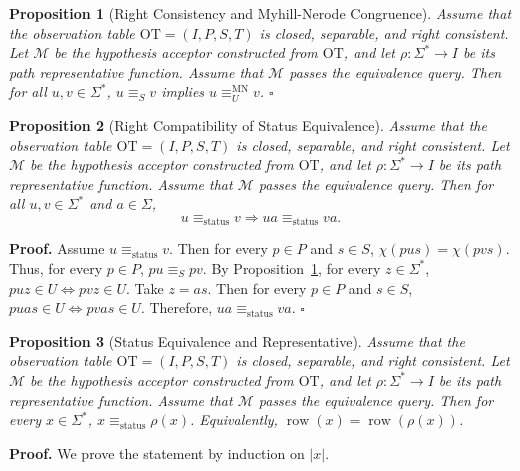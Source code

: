 \documentclass{ieice-tecrep}
\newtheorem{proposition}{Proposition}
\begin{document}
\begin{proposition}[Right Consistency and Myhill-Nerode Congruence]\label{proposition-2.3-right-consistency-and-myhill-nerode-congruence}
Assume that the observation table
\(\mathrm{OT}=(I,P,S,T)\) is closed, separable, and right consistent.
Let \(\mathcal{M}\) be the hypothesis acceptor constructed from \(\mathrm{OT}\),
and let \(\rho:\Sigma^*\to I\) be its path representative function.
Assume that \(\mathcal{M}\) passes the equivalence query. Then for all \(u,v\in\Sigma^*\), \(u\equiv_Sv\) implies
\(u\equiv_U^{\mathrm{MN}}v\). \hfill $\square$
\end{proposition}


\begin{proposition}[Right Compatibility of Status Equivalence]\label{proposition-2.4-stable-right-transition-of-status-equivalence-i-dont-have-any-idea-about-the-name-of-this-title}
Assume that the observation table
\(\mathrm{OT}=(I,P,S,T)\) is closed, separable, and right consistent.
Let \(\mathcal{M}\) be the hypothesis acceptor constructed from \(\mathrm{OT}\),
and let \(\rho:\Sigma^*\to I\) be its path representative function.
Assume that \(\mathcal{M}\) passes the equivalence query. Then for all \(u,v\in\Sigma^*\) and \(a\in\Sigma\),
\[
u\equiv_{\mathrm{status}}v
\Longrightarrow
ua\equiv_{\mathrm{status}}va.
\]
\end{proposition}
\noindent\textbf{Proof.} Assume \(u\equiv_{\mathrm{status}}v\). Then for every
\(p\in P\) and \(s\in S\), \(\chi(pus)=\chi(pvs)\). Thus, for every \(p\in P\), \(pu\equiv_S pv\). By Proposition~\ref{proposition-2.3-right-consistency-and-myhill-nerode-congruence}, for every \(z\in\Sigma^*\), \(puz\in U\Longleftrightarrow pvz\in U\). Take \(z=as\). Then for every \(p\in P\) and \(s\in S\), \(puas\in U\Longleftrightarrow pvas\in U\). Therefore, \(ua\equiv_{\mathrm{status}}va\).
\hfill $\square$


\begin{proposition}[Status Equivalence and Representative]\label{proposition-2.5-status-equivalence-and Representative}
Assume that the observation table
\(\mathrm{OT}=(I,P,S,T)\) is closed, separable, and right consistent.
Let \(\mathcal{M}\) be the hypothesis acceptor constructed from \(\mathrm{OT}\),
and let \(\rho:\Sigma^*\to I\) be its path representative function.
Assume that \(\mathcal{M}\) passes the equivalence query. Then for every \(x\in\Sigma^*\), \(x\equiv_{\mathrm{status}}\rho(x)\). Equivalently, \(\operatorname{row}(x)=\operatorname{row}(\rho(x))\).
\end{proposition}
\noindent\textbf{Proof.} We prove the statement by induction on \(|x|\).
\end{document}
